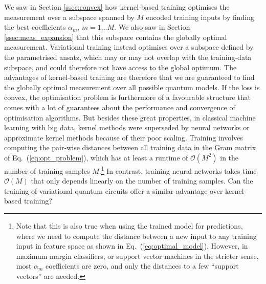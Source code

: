 \documentclass[aps, reprint, onecolumn, nofootinbib, longbibliography]{revtex4-2}
\begin{document}
We saw in Section \ref{ssec:convex} how kernel-based training optimises the measurement over a subspace spanned by $M$ encoded training inputs by finding the best coefficients $\alpha_m$, $m=1\dots M$. We also saw in Section \ref{ssec:meas_expansion} that this subspace contains the globally optimal measurement. Variational training instead optimises over a subspace defined by the parametrised ansatz, which may or may not overlap with the training-data subspace, and could therefore not have access to the global optimum. The advantages of kernel-based training are therefore that we are guaranteed to find the globally optimal measurement over all possible quantum models. If the loss is convex, the optimisation problem is furthermore of a favourable structure that comes with a lot of guarantees about the performance and convergence of optimisation algorithms. But besides these great properties, in classical machine learning with big data, kernel methods were superseded by neural networks or approximate kernel methods \citep{rahimi2007random} because of their poor scaling. Training involves computing the pair-wise distances between all training data in the Gram matrix of Eq.~(\ref{eq:opt_problem}), which has at least a runtime of $\mathcal{O}(M^2)$ in the number of training samples $M$.\footnote{Note that this is also true when using the trained model for predictions, where we need to compute the distance between a new input to any training input in feature space as shown in Eq.~(\ref{eq:optimal_model}). However, in maximum margin classifiers, or support vector machines in the stricter sense, most $\alpha_m$ coefficients are zero, and only the distances to a few ``support vectors'' are needed.} In contrast, training neural networks takes time $\mathcal{O}(M)$ that only depends linearly on the number of training samples. Can the training of variational quantum circuits offer a similar advantage over kernel-based training?
\end{document}
